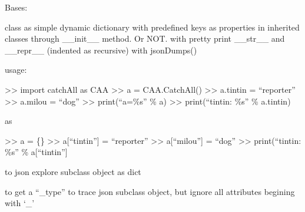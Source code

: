 \documentclass[a4paper,10pt,english]{sphinxmanual}
\begin{document}
\begin{fulllineitems}
\label{\detokenize{apidoc_src/src:src.catchAll.CatchAll}}
Bases: 

class as simple dynamic dictionary 
with predefined keys as properties in
inherited classes through \_\_init\_\_ method. Or NOT. 
with pretty print \_\_str\_\_ and \_\_repr\_\_ (indented as recursive)
with jsonDumps()

usage:

\textgreater{}\textgreater{} import catchAll as CAA
\textgreater{}\textgreater{} a = CAA.CatchAll()
\textgreater{}\textgreater{} a.tintin = “reporter”
\textgreater{}\textgreater{} a.milou = “dog”
\textgreater{}\textgreater{} print(“a=\%s” \% a)
\textgreater{}\textgreater{} print(“tintin: \%s” \% a.tintin)

as

\textgreater{}\textgreater{} a = \{\}
\textgreater{}\textgreater{} a{[}“tintin”{]} = “reporter”
\textgreater{}\textgreater{} a{[}“milou”{]} = “dog”
\textgreater{}\textgreater{} print(“tintin: \%s” \% a{[}“tintin”{]}

\begin{fulllineitems}
\label{\detokenize{apidoc_src/src:src.catchAll.CatchAll.jsonDumps}}
\end{fulllineitems}


\end{fulllineitems}


\begin{fulllineitems}
\label{\detokenize{apidoc_src/src:src.catchAll.dumper}}
to json explore subclass object as dict

\end{fulllineitems}


\begin{fulllineitems}
\label{\detokenize{apidoc_src/src:src.catchAll.dumperType}}
to get a “\_type” to trace json subclass object,
but ignore all attributes begining with ‘\_’

\end{fulllineitems}
\end{document}
